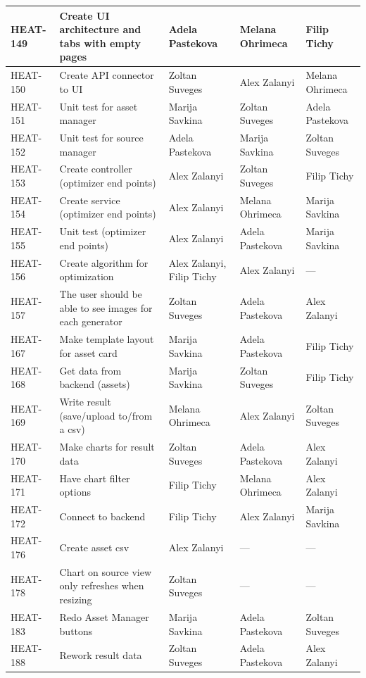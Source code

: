 \begin{longtable}{|p{1.5cm}|p{4.5cm}|p{2.8cm}|p{2.6cm}|p{2.6cm}|}
HEAT-149 & Create UI architecture and tabs with empty pages & Adela Pastekova & Melana Ohrimeca & Filip Tichy \\ \hline
HEAT-150 & Create API connector to UI & Zoltan Suveges & Alex Zalanyi & Melana Ohrimeca \\ \hline
HEAT-151 & Unit test for asset manager & Marija Savkina & Zoltan Suveges & Adela Pastekova \\ \hline
HEAT-152 & Unit test for source manager & Adela Pastekova & Marija Savkina & Zoltan Suveges \\ \hline
HEAT-153 & Create controller (optimizer end points) & Alex Zalanyi & Zoltan Suveges & Filip Tichy \\ \hline
HEAT-154 & Create service (optimizer end points) & Alex Zalanyi & Melana Ohrimeca & Marija Savkina \\ \hline
HEAT-155 & Unit test (optimizer end points) & Alex Zalanyi & Adela Pastekova & Marija Savkina \\ \hline
HEAT-156 & Create algorithm for optimization & Alex Zalanyi, Filip Tichy & Alex Zalanyi & --- \\ \hline
HEAT-157 & The user should be able to see images for each generator & Zoltan Suveges & Adela Pastekova & Alex Zalanyi \\ \hline
HEAT-167 & Make template layout for asset card & Marija Savkina & Adela Pastekova & Filip Tichy \\ \hline
HEAT-168 & Get data from backend (assets) & Marija Savkina & Zoltan Suveges & Filip Tichy \\ \hline
HEAT-169 & Write result (save/upload to/from a csv) & Melana Ohrimeca & Alex Zalanyi & Zoltan Suveges \\ \hline
HEAT-170 & Make charts for result data & Zoltan Suveges & Adela Pastekova & Alex Zalanyi \\ \hline
HEAT-171 & Have chart filter options & Filip Tichy & Melana Ohrimeca & Alex Zalanyi \\ \hline
HEAT-172 & Connect to backend & Filip Tichy & Alex Zalanyi & Marija Savkina \\ \hline
HEAT-176 & Create asset csv & Alex Zalanyi & --- & --- \\ \hline
HEAT-178 & Chart on source view only refreshes when resizing & Zoltan Suveges & --- & --- \\ \hline
HEAT-183 & Redo Asset Manager buttons & Marija Savkina & Adela Pastekova & Zoltan Suveges \\ \hline
HEAT-188 & Rework result data & Zoltan Suveges & Adela Pastekova & Alex Zalanyi \\ \hline

\end{longtable}
